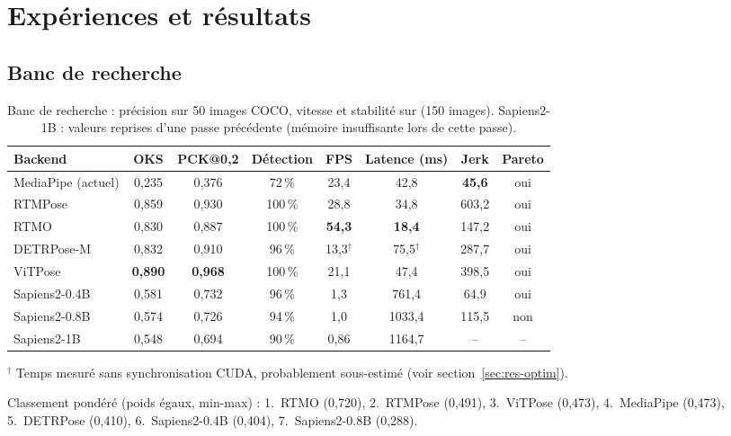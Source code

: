 \documentclass[11pt,a4paper]{report}
\newcommand{\code}[1]{\texttt{\detokenize{#1}}}
\begin{document}
\chapter{Expériences et résultats}
\label{chap:resultats}

\section{Banc de recherche}
\label{sec:res-banc}

\begin{table}[H]
\centering
\caption{Banc de recherche : précision sur 50 images COCO, vitesse et stabilité sur \code{Video.mp4} (150
images). Sapiens2-1B : valeurs reprises d'une passe précédente (mémoire insuffisante lors de cette passe).}
\label{tab:banc}
\small
\begin{tabular}{@{}lccccccc@{}}
\toprule
Backend & OKS & PCK@0,2 & Détection & FPS & Latence (ms) & Jerk & Pareto \\
\midrule
MediaPipe (actuel) & 0,235 & 0,376 & 72\,\% & 23,4 & 42,8 & \textbf{45,6} & oui \\
RTMPose & 0,859 & 0,930 & 100\,\% & 28,8 & 34,8 & 603,2 & oui \\
RTMO & 0,830 & 0,887 & 100\,\% & \textbf{54,3} & \textbf{18,4} & 147,2 & oui \\
DETRPose-M & 0,832 & 0,910 & 96\,\% & 13,3$^\dagger$ & 75,5$^\dagger$ & 287,7 & oui \\
ViTPose & \textbf{0,890} & \textbf{0,968} & 100\,\% & 21,1 & 47,4 & 398,5 & oui \\
Sapiens2-0.4B & 0,581 & 0,732 & 96\,\% & 1,3 & 761,4 & 64,9 & oui \\
Sapiens2-0.8B & 0,574 & 0,726 & 94\,\% & 1,0 & 1033,4 & 115,5 & non \\
Sapiens2-1B & 0,548 & 0,694 & 90\,\% & 0,86 & 1164,7 & -- & -- \\
\bottomrule
\end{tabular}

\smallskip
\footnotesize $^\dagger$ Temps mesuré sans synchronisation CUDA, probablement sous-estimé (voir
section~\ref{sec:res-optim}).
\end{table}

Classement pondéré (poids égaux, min-max) : 1.~RTMO (0,720), 2.~RTMPose (0,491), 3.~ViTPose (0,473),
4.~MediaPipe (0,473), 5.~DETRPose (0,410), 6.~Sapiens2-0.4B (0,404), 7.~Sapiens2-0.8B (0,288).
\end{document}
